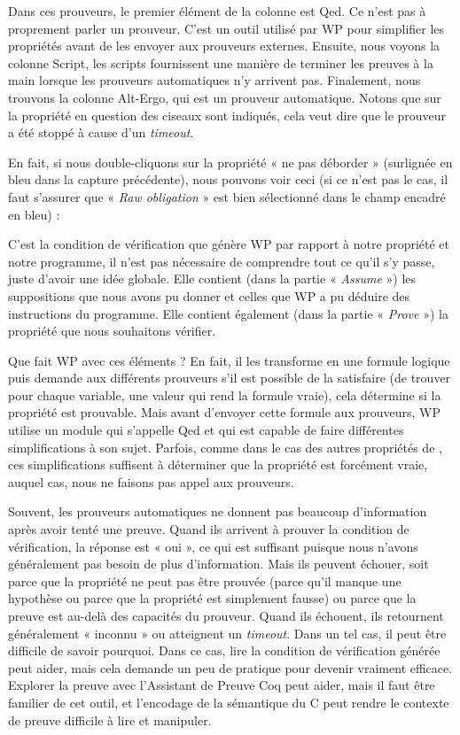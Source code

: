 Dans ces prouveurs, le premier élément de la colonne est Qed. Ce n'est pas
à proprement parler un prouveur. C'est un outil utilisé par WP pour simplifier
les propriétés avant de les envoyer aux prouveurs externes. Ensuite, nous
voyons la colonne Script, les scripts fournissent une manière de terminer
les preuves à la main lorsque les prouveurs automatiques n'y arrivent pas.
Finalement, nous trouvons la colonne Alt-Ergo, qui est un prouveur automatique.
Notons que sur la propriété en question des ciseaux sont indiqués, cela
veut dire que le prouveur a été stoppé à cause d'un \textit{timeout}.


En fait, si nous double-cliquons sur la
propriété « ne pas déborder » (surlignée en bleu dans la capture précédente),
nous pouvons voir ceci (si ce n'est pas le cas, il faut s'assurer que
« \textit{Raw obligation} » est bien sélectionné dans le champ encadré en bleu) :





C'est la condition de vérification que génère WP par rapport à notre propriété et
notre programme, il n'est pas nécessaire de comprendre tout ce qu'il s'y passe,
juste d'avoir une idée globale. Elle contient (dans la partie « \textit{Assume} ») les
suppositions que nous avons pu donner et celles que WP a pu déduire des
instructions du programme. Elle contient également (dans la partie « \textit{Prove} »)
la propriété que nous souhaitons vérifier.



Que fait WP avec ces éléments ? En fait, il les transforme en une formule
logique puis demande aux différents prouveurs s'il est possible de la
satisfaire (de trouver pour chaque variable, une valeur qui rend la formule
vraie), cela détermine si la propriété est prouvable. Mais avant d'envoyer
cette formule aux prouveurs, WP utilise un module qui s'appelle Qed et qui est
capable de faire différentes simplifications à son sujet. Parfois, comme dans
le cas des autres propriétés de , ces simplifications suffisent à
déterminer que la propriété est forcément vraie, auquel cas, nous ne faisons
pas appel aux prouveurs.


Souvent, les prouveurs automatiques ne donnent pas beaucoup d'information après
avoir tenté une preuve. Quand ils arrivent à prouver la condition de vérification,
la réponse est « oui », ce qui est suffisant puisque nous n'avons généralement
pas besoin de plus d'information. Mais ils peuvent échouer, soit parce que la
propriété ne peut pas être prouvée (parce qu'il manque une hypothèse ou parce
que la propriété est simplement fausse) ou parce que la preuve est au-delà des
capacités du prouveur. Quand ils échouent, ils retournent généralement « inconnu »
ou atteignent un \textit{timeout}. Dans un tel cas, il peut être difficile de
savoir pourquoi. Dans ce cas, lire la condition de vérification générée peut 
aider, mais cela demande un peu de pratique pour devenir vraiment efficace. 
Explorer la preuve avec l'Assistant de Preuve Coq peut aider, mais il faut être
familier de cet outil, et l'encodage de la sémantique du C peut rendre le
contexte de preuve difficile à lire et manipuler.

